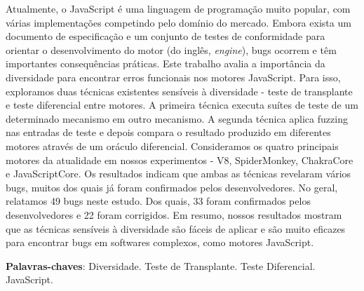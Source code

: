 \begin{resumo}[Resumo]
	\noindent %
	Atualmente, o JavaScript é uma linguagem de programação muito popular,
	com várias implementações competindo pelo domínio do mercado.
	Embora exista um documento de especificação e um conjunto de testes 
	de conformidade para orientar o desenvolvimento do motor (do inglês, \textit{engine}),
	bugs ocorrem e têm importantes consequências práticas.
	Este trabalho avalia a importância da diversidade para encontrar erros 
	funcionais nos motores JavaScript. Para isso, exploramos duas técnicas existentes 
	sensíveis à diversidade - teste de transplante e teste diferencial entre motores.
	A primeira técnica executa suítes de teste de um determinado mecanismo em outro
	mecanismo. A segunda técnica aplica fuzzing nas entradas de teste e depois
	compara o resultado produzido em diferentes motores através de um oráculo diferencial.
	Consideramos os quatro principais motores da atualidade em nossos
	experimentos - V8, SpiderMonkey, ChakraCore e JavaScriptCore.
	Os resultados indicam que ambas as técnicas revelaram vários bugs,
	muitos dos quais já foram confirmados pelos desenvolvedores.
	No geral, relatamos 49 bugs neste estudo. Dos quais, 33 foram confirmados 
	pelos desenvolvedores e 22 foram corrigidos.
	Em resumo, nossos resultados mostram que as técnicas sensíveis à
	diversidade são fáceis de aplicar e são muito eficazes para encontrar
	bugs em softwares complexos, como motores JavaScript.
	
   \vspace{\onelineskip}
   \noindent
   \textbf{Palavras-chaves}: Diversidade. Teste de Transplante. Teste Diferencial. JavaScript.
\end{resumo}